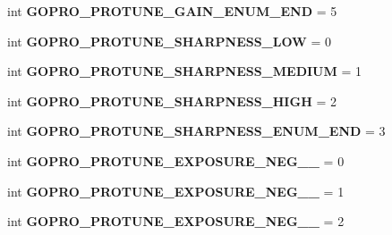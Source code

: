 \begin{DoxyCompactItemize}
\item 
\mbox{\label{namespacepymavlink_1_1dialects_1_1v10_a93af36af2c6ccd6143f278cfadbaf09d}} 
int {\bfseries G\+O\+P\+R\+O\+\_\+\+P\+R\+O\+T\+U\+N\+E\+\_\+\+G\+A\+I\+N\+\_\+\+E\+N\+U\+M\+\_\+\+E\+ND} = 5
\item 
\mbox{\label{namespacepymavlink_1_1dialects_1_1v10_ab93e959c93de90b58c6cf6296b811d86}} 
int {\bfseries G\+O\+P\+R\+O\+\_\+\+P\+R\+O\+T\+U\+N\+E\+\_\+\+S\+H\+A\+R\+P\+N\+E\+S\+S\+\_\+\+L\+OW} = 0
\item 
\mbox{\label{namespacepymavlink_1_1dialects_1_1v10_a37f414c8cdb95ad2cf9e3e5060a8b608}} 
int {\bfseries G\+O\+P\+R\+O\+\_\+\+P\+R\+O\+T\+U\+N\+E\+\_\+\+S\+H\+A\+R\+P\+N\+E\+S\+S\+\_\+\+M\+E\+D\+I\+UM} = 1
\item 
\mbox{\label{namespacepymavlink_1_1dialects_1_1v10_a18d5bcfae060848f5f1048ac21dba82a}} 
int {\bfseries G\+O\+P\+R\+O\+\_\+\+P\+R\+O\+T\+U\+N\+E\+\_\+\+S\+H\+A\+R\+P\+N\+E\+S\+S\+\_\+\+H\+I\+GH} = 2
\item 
\mbox{\label{namespacepymavlink_1_1dialects_1_1v10_a149a0c801da96ead5384df1d16712ed5}} 
int {\bfseries G\+O\+P\+R\+O\+\_\+\+P\+R\+O\+T\+U\+N\+E\+\_\+\+S\+H\+A\+R\+P\+N\+E\+S\+S\+\_\+\+E\+N\+U\+M\+\_\+\+E\+ND} = 3
\item 
\mbox{\label{namespacepymavlink_1_1dialects_1_1v10_a9e74b9519d5ad0be9200f8ccf6c068ac}} 
int {\bfseries G\+O\+P\+R\+O\+\_\+\+P\+R\+O\+T\+U\+N\+E\+\_\+\+E\+X\+P\+O\+S\+U\+R\+E\+\_\+\+N\+E\+G\+\_\+\_} = 0
\item 
\mbox{\label{namespacepymavlink_1_1dialects_1_1v10_aaca6ca32acf2066c30f31cebd613ef37}} 
int {\bfseries G\+O\+P\+R\+O\+\_\+\+P\+R\+O\+T\+U\+N\+E\+\_\+\+E\+X\+P\+O\+S\+U\+R\+E\+\_\+\+N\+E\+G\+\_\+\_} = 1
\item 
\mbox{\label{namespacepymavlink_1_1dialects_1_1v10_aa31a5326652096cba36ddce1b1d816a6}} 
int {\bfseries G\+O\+P\+R\+O\+\_\+\+P\+R\+O\+T\+U\+N\+E\+\_\+\+E\+X\+P\+O\+S\+U\+R\+E\+\_\+\+N\+E\+G\+\_\+\_} = 2

\end{DoxyCompactItemize}
